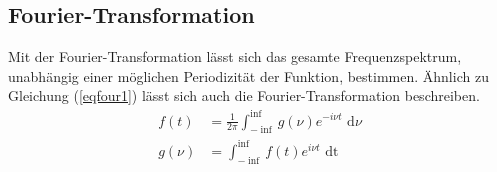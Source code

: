 \subsection{Fourier-Transformation}
Mit der Fourier-Transformation lässt sich das gesamte Frequenzspektrum, unabhängig einer
möglichen Periodizität der Funktion, bestimmen. Ähnlich zu Gleichung (\ref{eqfour1}) lässt sich auch die 
Fourier-Transformation beschreiben.
\begin{align}
f(t)&=\frac{1}{2 \pi} \int_{-\inf}^\inf g(\nu) e^{-i \nu t} \text{ d}\nu \\
g(\nu)&=\int_{-\inf}^\inf f(t) e^{i \nu t} \text{ dt} \label{eqfout2}
\end{align}
